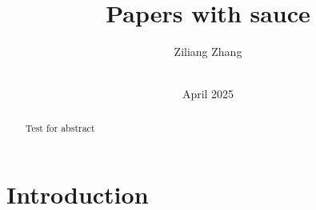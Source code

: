 \documentclass[10pt,conference]{IEEEtran}
\title{Papers with sauce}
\author{%
Ziliang Zhang\\
\affaddr{University of California, Riverside}\\
\email{zzhan357@ucr.edu}%
}
\date{April 2025}
\theoremstyle{definition}
\begin{document}
\maketitle

\thispagestyle{fancy}

\begin{abstract} 
Test for abstract
\end{abstract}

\section{Introduction}
\end{document}
